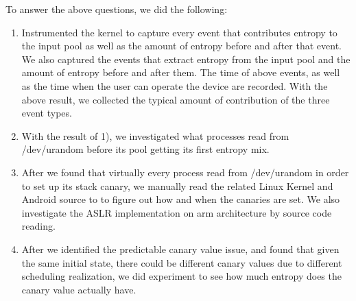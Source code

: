To answer the above questions, we did the following:
\begin{enumerate}
\item Instrumented the kernel to capture every event that contributes entropy to the input pool as well as the amount of entropy before and after that event. We also captured the events that extract entropy from the input pool and the amount of entropy before and after them. The time of above events, as well as the time when the user can operate the device are recorded. With the above result, we collected the typical amount of contribution of the three event types.

\item With the result of 1), we investigated what processes read from /dev/urandom before its pool getting its first entropy mix.

\item After we found that virtually every process read from /dev/urandom in order to set up its stack canary, we manually read the related Linux Kernel and Android source to to figure out how and when the canaries are set. We also investigate the ASLR implementation on arm architecture by source code reading.

\item After we identified the predictable canary value issue, and found that given the same initial state, there could be different canary values due to different scheduling realization, we did experiment to see how much entropy does the canary value actually have.

\end{enumerate}




